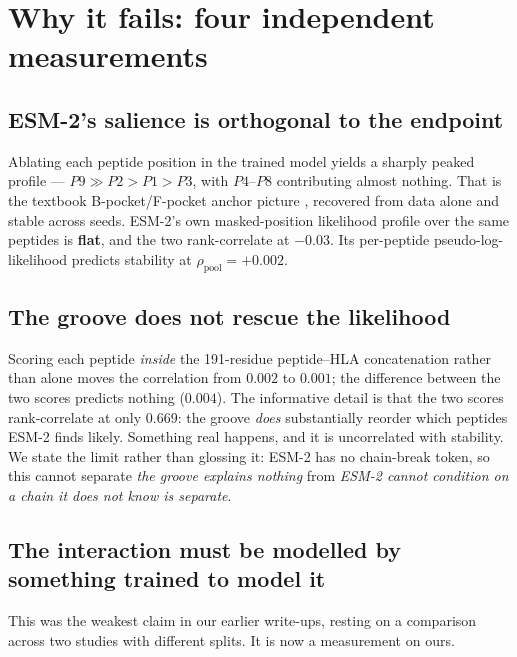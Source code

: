 \documentclass[11pt,a4paper]{article}
\newcommand{\rhop}{\rho_{\text{pool}}}
\begin{document}
\section{Why it fails: four independent measurements}

\subsection{ESM-2's salience is orthogonal to the endpoint}

Ablating each peptide position in the trained model yields a sharply peaked profile ---
$P9 \gg P2 > P1 > P3$, with $P4$--$P8$ contributing almost nothing. That is the textbook
B-pocket/F-pocket anchor picture \citep{rammensee1999}, recovered from data alone and stable
across seeds. ESM-2's own masked-position likelihood profile over the same peptides is
\textbf{flat}, and the two rank-correlate at $\mathbf{-0.03}$. Its per-peptide pseudo-log-likelihood
predicts stability at $\rhop = +0.002$.

\subsection{The groove does not rescue the likelihood}

Scoring each peptide \emph{inside} the 191-residue peptide--HLA concatenation rather than alone
moves the correlation from $0.002$ to $0.001$; the difference between the two scores predicts
nothing ($0.004$). The informative detail is that the two scores rank-correlate at only
$\mathbf{0.669}$: the groove \emph{does} substantially reorder which peptides ESM-2 finds likely.
Something real happens, and it is uncorrelated with stability. We state the limit rather than
glossing it: ESM-2 has no chain-break token, so this cannot separate \emph{the groove explains
nothing} from \emph{ESM-2 cannot condition on a chain it does not know is separate}.

\subsection{The interaction must be modelled by something trained to model it}
\label{sec:interaction}

This was the weakest claim in our earlier write-ups, resting on a comparison across two studies
with different splits. It is now a measurement on ours.
\end{document}
